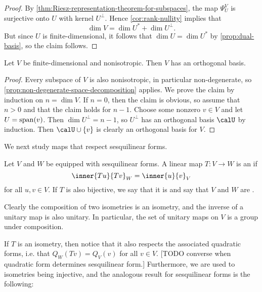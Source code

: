 \begin{proof}
    By \cref{thm:Riesz-representation-theorem-for-subspaces}, the map $\Psi^V_U$ is surjective onto $U$ with kernel $U^\perp$. Hence \cref{cor:rank-nullity} implies that
    \begin{equation*}
        \dim V
            = \dim U^* + \dim U^\perp.
    \end{equation*}
    But since $U$ is finite-dimensional, it follows that $\dim U = \dim U^*$ by \cref{prop:dual-basis}, so the claim follows.
\end{proof}


\begin{corollary}
    \label{cor:orthogonal-basis-existence}
    Let $V$ be finite-dimensional and nonisotropic. Then $V$ has an orthogonal basis.
\end{corollary}

\begin{proof}
    Every subspace of $V$ is also nonisotropic, in particular non-degenerate, so \cref{prop:non-degenerate-space-decomposition} applies. We prove the claim by induction on $n = \dim V$. If $n = 0$, then the claim is obvious, so assume that $n > 0$ and that the claim holds for $n-1$. Choose some nonzero $v \in V$ and let $U = \operatorname{span}(v)$. Then $\dim U^\perp = n-1$, so $U^\perp$ has an orthogonal basis $\calU$ by induction. Then $\calU \union \{v\}$ is clearly an orthogonal basis for $V$.
\end{proof}


We next study maps that respect sesquilinear forms.

\begin{definition}[Isometry]
    \label{def:isometry}
    Let $V$ and $W$ be equipped with sesquilinear forms. A linear map $T \colon V \to W$ is an  if
    \begin{equation*}
        \inner{Tu}{Tv}_W
            = \inner{u}{v}_V
    \end{equation*}
    for all $u,v \in V$. If $T$ is also bijective, we say that it is  and say that $V$ and $W$ are .
\end{definition}
%
Clearly the composition of two isometries is an isometry, and the inverse of a unitary map is also unitary. In particular, the set of unitary maps on $V$ is a group under composition.

If $T$ is an isometry, then notice that it also respects the associated quadratic forms, i.e. that $Q_W(Tv) = Q_V(v)$ for all $v \in V$. [TODO converse when quadratic form determines sesquilinear form.] Furthermore, we are used to isometries being injective, and the analogous result for sesquilinear forms is the following:

